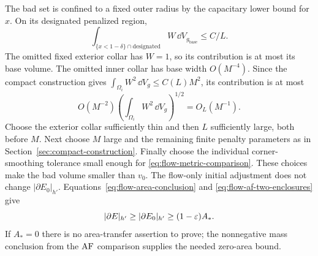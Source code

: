 The bad set is confined to a fixed outer radius by the capacitary
lower bound for $x$.  On its designated penalized region,
\begin{equation}\label{eq:flow-af-bad-volume}
 \int_{\{x<1-\delta\}\cap\mathrm{designated}}
                       W\,\dd V_{g_{\mathrm{base}}}\le C/L.
\end{equation}
The omitted fixed exterior collar has $W=1$, so its contribution is
at most its base volume.  The omitted inner collar has base width
$O(M^{-4})$.  Since the compact construction gives
$\int_{\Omega_i}W^2\,\dd V_g\le C(L)M^2$, its contribution is at
most
\begin{equation}\label{eq:flow-inner-collar-cost}
 O(M^{-2})\left(\int_{\Omega_i}W^2\,\dd V_g\right)^{1/2}
 =O_L(M^{-1}).
\end{equation}
Choose the exterior collar sufficiently thin and then $L$
sufficiently large, both before $M$.  Next choose $M$ large and the
remaining finite penalty parameters as in
Section~\ref{sec:compact-construction}.  Finally choose the individual
corner-smoothing tolerance small enough for
\eqref{eq:flow-metric-comparison}.  These choices make the bad volume
smaller than $v_0$.  The flow-only initial adjustment does not change
$|\partial E_0|_{h'}$.  Equations~\eqref{eq:flow-area-conclusion} and
\eqref{eq:flow-af-two-enclosures} give
\begin{equation}\label{eq:flow-af-area-conclusion}
 |\partial E|_{h'}\ge|\partial E_0|_{h'}\ge(1-\varepsilon)A_*.
\end{equation}
If $A_*=0$ there is no area-transfer assertion to prove; the
nonnegative mass conclusion from the $\mathrm{AF}$ comparison supplies the
needed zero-area bound.
